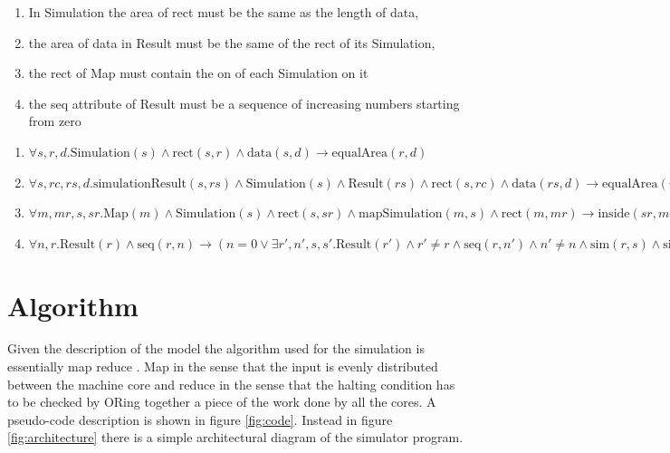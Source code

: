 \documentclass[Lau]{sapthesis} %
\let\oldsection\section
\def\subsection{\oldsection}
\def\section{\chapter}
\begin{document}
\begin{enumerate}
\item In Simulation the area of rect must be the same as the length of data,
\item the area of data in Result must be the same of the rect of its Simulation,
\item the rect of Map must contain the on of each Simulation on it
\item the seq attribute of Result must be a sequence of increasing numbers
starting from zero
\end{enumerate}

\begin{enumerate}
\item $\forall s,r,d.\textrm{Simulation}(s)
	\land \textrm{rect}(s,r)
	\land \textrm{data}(s,d)
	\rightarrow \textrm{equalArea}(r,d)$
\item $\forall s,rc,rs,d.\textrm{simulationResult}(s,rs) \allowbreak
	\land \textrm{Simulation}(s) \allowbreak
	\land \textrm{Result}(rs) \allowbreak
	\land \textrm{rect}(s,rc) \allowbreak
	\land \textrm{data}(rs,d) \allowbreak
	\rightarrow\textrm{equalArea}(rc,d)$
\item $\forall m,mr,s,sr. \textrm{Map}(m)
	\land \textrm{Simulation}(s) \allowbreak
	\land \textrm{rect}(s,sr) \allowbreak
	\land \textrm{mapSimulation}(m,s) \allowbreak
	\land \textrm{rect}(m,mr) \allowbreak
	\rightarrow \textrm{inside}(sr,mr)$
\item $\forall n,r.\textrm{Result}(r)
	\land\textrm{seq}(r,n)
	\rightarrow
	(n=0 \lor \exists r',n',s,s'.\textrm{Result}(r')
		\land r'\neq r
		\land \textrm{seq}(r,n')
		\land n'\neq n
		\land \textrm{sim}(r,s)
		\land \textrm{sim}(r',s')
		\land s'=s\rightarrow n'=n-1)$
\end{enumerate}

\subsection{Algorithm}

Given the description of the model the algorithm used for the simulation is
essentially map reduce \cite{sac}. Map in the sense that the input is evenly
distributed between the machine core and reduce in the sense that the halting
condition has to be checked by ORing together a piece of the work done by all
the cores. A pseudo-code description is shown in figure \ref{fig:code}.  Instead
in figure \ref{fig:architecture} there is a simple architectural diagram of the
simulator program.
\end{document}
